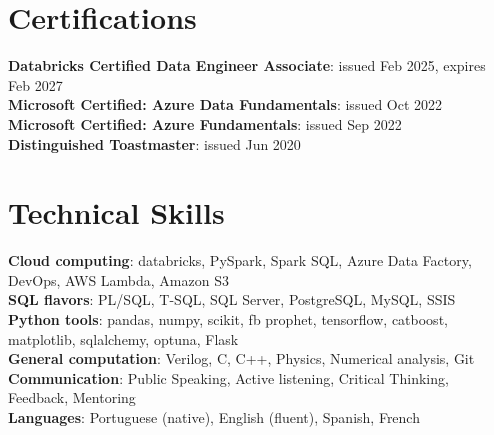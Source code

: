 \documentclass[a4paper,11pt]{article}
\begin{document}
\section{Certifications}
 \begin{itemize}[leftmargin=0.15in, label={}]
    \small{\item{
     \textbf{Databricks Certified Data Engineer Associate}{: issued Feb 2025, expires Feb 2027} \\
     \textbf{Microsoft Certified: Azure Data Fundamentals}{: issued Oct 2022} \\
     \textbf{Microsoft Certified: Azure Fundamentals}{: issued Sep 2022} \\
     \textbf{Distinguished Toastmaster}{: issued Jun 2020}
    }}
 \end{itemize}


\section{Technical Skills}
 \begin{itemize}[leftmargin=0.15in, label={}]
    \small{\item{
     \textbf{Cloud computing}{: databricks, PySpark, Spark SQL, Azure Data Factory, DevOps, AWS Lambda, Amazon S3} \\
     \textbf{SQL flavors}{: PL/SQL, T-SQL, SQL Server, PostgreSQL, MySQL, SSIS} \\
     \textbf{Python tools}{: pandas, numpy, scikit, fb prophet, tensorflow, catboost, matplotlib, sqlalchemy, optuna, Flask} \\
     \textbf{General computation}{: Verilog, C, C++, Physics, Numerical analysis, Git} \\
     \textbf{Communication}{: Public Speaking, Active listening, Critical Thinking, Feedback, Mentoring} \\
     \textbf{Languages}{: Portuguese (native), English (fluent), Spanish, French}
    }}
 \end{itemize}

\end{document}
